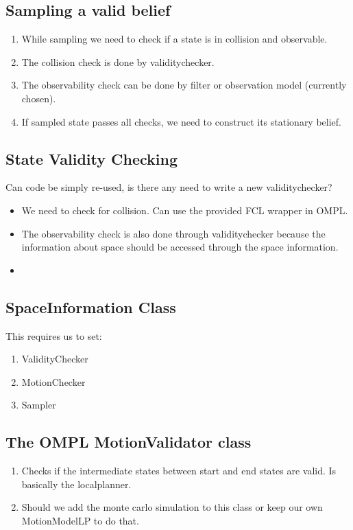 \subsection{Sampling a valid belief}

\begin{enumerate}
 \item While sampling we need to check if a state is in collision and observable. 
 \item The collision check is done by validitychecker. 
 \item The observability check can be done by filter or observation model (currently chosen).
 \item If sampled state passes all checks, we need to construct its stationary belief.
\end{enumerate}


\subsection{State Validity Checking}
Can code be simply re-used, is there any need to write a new validitychecker? 

\begin{itemize}
 \item We need to check for collision. Can use the provided FCL wrapper in OMPL.
 \item The observability check is also done through validitychecker because the information about space should be accessed through the space information.
 \item 
\end{itemize}

\subsection{SpaceInformation Class}

This requires us to set:
\begin{enumerate}
 \item ValidityChecker
 \item MotionChecker
 \item Sampler
\end{enumerate}

\subsection{The OMPL MotionValidator class}

\begin{enumerate}
 \item Checks if the intermediate states between start and end states are valid. Is basically the localplanner.
 \item Should we add the monte carlo simulation to this class or keep our own MotionModelLP to do that.
\end{enumerate}


